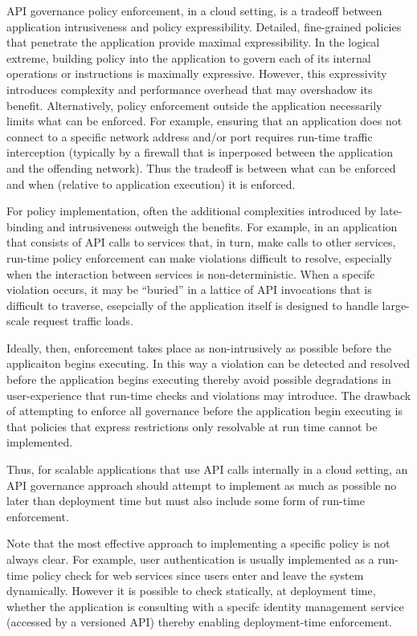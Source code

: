 API governance policy enforcement, in a cloud setting, is a tradeoff between
application intrusiveness and policy expressibility.  Detailed, fine-grained
policies that penetrate the application provide maximal expressibility.
In the logical extreme, building policy into the application to govern each of
its internal operations or instructions is maximally expressive.  However, this 
expressivity
introduces complexity and performance overhead that may overshadow its
benefit.  Alternatively, policy enforcement outside the application
necessarily limits what can be enforced.  For example, ensuring that an
application does not connect to a specific network address and/or port
requires run-time traffic interception (typically by a firewall that is
inperposed between the application and the offending network).
Thus the tradeoff is between what can be enforced and when (relative to
application execution) it is enforced.

For policy implementation, often the additional complexities introduced by
late-binding and intrusiveness outweigh the benefits.  For example, in an
application that consists of API calls to services that, in turn, make calls
to other services, run-time policy enforcement can make violations difficult
to resolve, especially when the interaction between services is
non-deterministic.  When a specifc violation occurs, it may be ``buried'' in a
lattice of API invocations that is difficult to traverse, esepcially of the
application itself is designed to handle large-scale request traffic loads.

Ideally, then, enforcement takes place as non-intrusively as possible before
the applicaiton begins executing.  In this way a violation can be detected and
resolved before the application begins executing thereby avoid possible
degradations in user-experience that run-time checks and violations may
introduce.  The drawback of attempting to enforce all governance before the
application begin executing is that policies that express restrictions only
resolvable at run time cannot be implemented.  

Thus, for scalable applications that use API calls internally in a cloud
setting, an API governance approach should attempt to implement as much as
possible no later than deployment time but must also include some form of
run-time enforcement.  

Note that the most effective approach to implementing a specific policy is not
always clear.  For example, user authentication is usually implemented as a
run-time policy check for web services since users enter and leave the system dynamically.
However it is possible to check statically, at deployment time, whether the
application is consulting with a specifc identity management service (accessed
by a versioned API) thereby enabling deployment-time enforcement.

